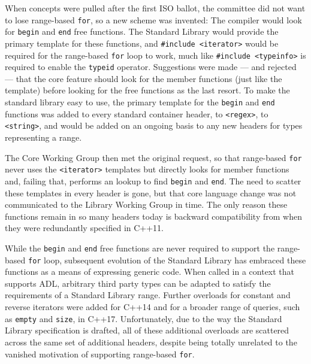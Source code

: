 When concepts were pulled after the first ISO ballot, the committee did
not want to lose range-based \lstinline!for!, so a new scheme was invented:
The compiler would look for \lstinline!begin! and \lstinline!end! free
functions. The Standard Library would provide the primary template for
these functions, and \lstinline!#include!~\lstinline!<iterator>! would be
required for the range-based \lstinline!for! loop to work, much like
\lstinline!#include!~\lstinline!<typeinfo>! is required to enable the
\lstinline!typeid! operator. Suggestions were made --- and rejected ---
that the core feature should look for the member functions (just like
the template) before looking for the free functions as the last resort.
To make the standard library easy to use, the primary template for the
\lstinline!begin! and \lstinline!end! functions was added to every standard
container header, to \lstinline!<regex>!, to \lstinline!<string>!, and would
be added on an ongoing basis to any new headers for types representing a
range.

The Core Working Group then met the original request, so that
range-based \lstinline!for! never uses the \lstinline!<iterator>! templates
but directly looks for member functions and, failing that, performs an
 lookup to find \lstinline!begin! and \lstinline!end!. The need to
scatter these templates in every header is gone, but that core language
change was not communicated to the Library Working Group in time. The
only reason these functions remain in so many headers today is backward
compatibility from when they were redundantly specified in C++11.

While the \lstinline!begin! and \lstinline!end! free functions are never
required to support the range-based \lstinline!for! loop, subsequent
evolution of the Standard Library has embraced these functions as a
means of expressing generic code. When called in a context that supports
ADL, arbitrary third party types can be adapted to satisfy the
requirements of a Standard Library range. Further overloads for constant
and reverse iterators were added for C++14 and for a broader range of
queries, such as \lstinline!empty! and \lstinline!size!, in C++17.
Unfortunately, due to the way the Standard Library specification is
drafted, all of these additional overloads are scattered across the same
set of additional headers, despite being totally unrelated to the
vanished motivation of supporting range-based \lstinline!for!.


